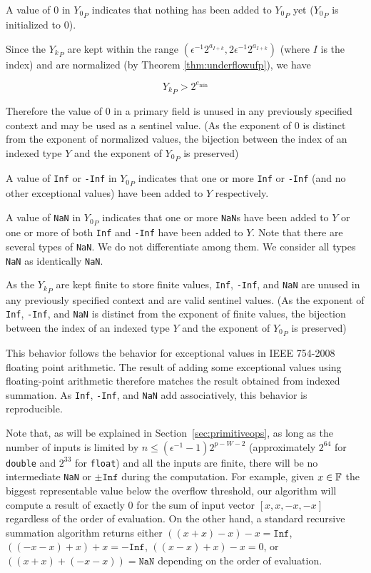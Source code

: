       A value of $0$ in ${Y_0}_P$ indicates that nothing has been added to
      ${Y_0}_P$ yet (${Y_0}_P$ is initialized to $0$).

      Since the ${Y_k}_P$ are kept within the range
      \(
      	(\epsilon^{-1}  2^{a_{I + k}}, 2 \epsilon^{-1} 2^{a_{I + k}})
      \) (where $I$ is the index) and are
      normalized (by Theorem \ref{thm:underflowufp}), we have

      \begin{equation*}
        {Y_k}_P > 2^{e_{\min}}
      \end{equation*}

      Therefore the value of $0$ in a primary field is unused in any previously
      specified context and may be used as a sentinel value. (As the exponent
      of $0$ is distinct from the exponent of normalized values, the bijection
      between the index of an indexed type $Y$ and the exponent of ${Y_0}_P$ is
      preserved)

      A value of \texttt{Inf} or \texttt{-Inf} in ${Y_0}_P$ indicates that one or more \texttt{Inf} or \texttt{-Inf} (and no other exceptional values) have been added to $Y$ respectively.

      A value of \texttt{NaN} in ${Y_0}_P$ indicates that one or more \texttt{NaN}s have been added to $Y$ or one or more of both \texttt{Inf} and \texttt{-Inf} have been added to $Y$. Note that there are several types of \texttt{NaN}. We do not differentiate among them. We consider all types \texttt{NaN} as identically \texttt{NaN}.

      As the ${Y_k}_P$ are kept finite to store finite values, \texttt{Inf}, \texttt{-Inf}, and \texttt{NaN} are unused in any previously specified context and are valid sentinel values. (As the exponent of \texttt{Inf}, \texttt{-Inf}, and \texttt{NaN} is distinct from the exponent of finite values, the bijection between the index of an indexed type $Y$ and the exponent of ${Y_0}_P$ is preserved)

      This behavior follows the behavior for exceptional values in IEEE
      754-2008 floating point arithmetic. The result of adding some exceptional
      values using floating-point arithmetic therefore matches the result
      obtained from indexed summation. As \texttt{Inf}, \texttt{-Inf}, and
      \texttt{NaN} add associatively, this behavior is reproducible.

      Note that, as will be explained in Section~\ref{sec:primitiveops},
      as long as the number of inputs is limited by $n \leq (\epsilon^{-1} - 1)2^{p-W-2}$ (approximately $2^{64}$ for \texttt{double} and $2^{33}$ for \texttt{float})
      and all the inputs are finite, there will be no intermediate \texttt{NaN}
      or $\pm \texttt{Inf}$ during the computation.
      For example, given $x \in \mathbb{F}$ the biggest representable value below the
      overflow threshold, our algorithm will compute a result of exactly $0$ for
      the sum of input vector $[x,x,-x,-x]$ regardless of the order of evaluation.
      On the other hand, a standard recursive summation algorithm returns either
      $((x+x)-x)-x=\texttt{Inf}$, $((-x-x)+x)+x=-\texttt{Inf}$, $((x-x)+x)-x = 0$, 
      or $((x + x) + (-x-x)) = \texttt{NaN}$ depending on the order of evaluation.

